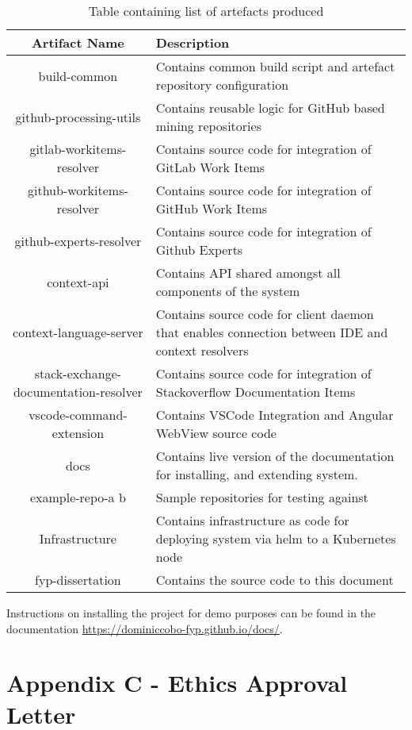 \begin{table}[h!]
\centering
\begin{tabular}{|c|p{8cm}|}
	\hline 
	Artifact Name & Description \\ 
	\hline 
	build-common & Contains common build script and artefact repository configuration \\ 
	\hline 
	github-processing-utils & Contains reusable logic for GitHub based mining repositories \\ 
	\hline 
	gitlab-workitems-resolver & Contains source code for integration of GitLab Work Items  \\ 
	\hline 
	github-workitems-resolver & Contains source code for integration of GitHub Work Items \\ 
	\hline 
	github-experts-resolver & Contains source code for integration of Github Experts \\ 
	\hline 
	context-api & Contains API shared amongst all components of the system \\ 
	\hline 
	context-language-server & Contains source code for client daemon that enables connection between IDE and context resolvers \\ 
	\hline 
	stack-exchange-documentation-resolver & Contains source code for integration of Stackoverflow Documentation Items \\ 
	\hline 
	vscode-command-extension & Contains VSCode Integration and Angular WebView source code \\ 
	\hline 
	docs & Contains live version of the documentation for installing, and extending system. \\ 
	\hline 
	example-repo-a b & Sample repositories for testing against \\ 
	\hline 
	Infrastructure & Contains infrastructure as code for deploying system via helm to a Kubernetes node \\ 
	\hline 
	fyp-dissertation & Contains the source code to this document \\ 
	\hline 
\end{tabular} 
\caption{Table containing list of artefacts produced}
\label{table:artefactsInProject}
\end{table}

Instructions on installing the project for demo purposes can be found in the documentation \url{https://dominiccobo-fyp.github.io/docs/}.

\section{Appendix C - Ethics Approval Letter}

